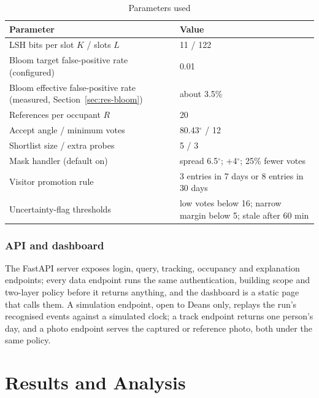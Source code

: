 \documentclass[12pt,a4paper,oneside]{report}
\begin{document}
\begin{table}[htbp]
\centering
\caption{Parameters used}\label{tab:params}
{\small\setlength{\tabcolsep}{4pt}\renewcommand{\arraystretch}{1.2}
\begin{tabular}{|p{7.39cm}|p{7.19cm}|}\hline
\textbf{Parameter} & \textbf{Value}\\\hline
LSH bits per slot $K$ / slots $L$ & 11 / 122\\\hline
Bloom target false-positive rate (configured) & 0.01\\\hline
Bloom effective false-positive rate (measured, Section~\ref{sec:res-bloom}) & about 3.5\%\\\hline
References per occupant $R$ & 20\\\hline
Accept angle / minimum votes & 80.43$^{\circ}$ / 12\\\hline
Shortlist size / extra probes & 5 / 3\\\hline
Mask handler (default on) & spread 6.5$^{\circ}$; +4$^{\circ}$; 25\% fewer votes\\\hline
Visitor promotion rule & 3 entries in 7 days or 8 entries in 30 days\\\hline
Uncertainty-flag thresholds & low votes below 16; narrow margin below 5; stale after 60 min\\\hline
\end{tabular}}
\end{table}

\subsection{API and dashboard}
The FastAPI server exposes login, query, tracking, occupancy and explanation endpoints; every data endpoint runs the same authentication, building scope and two-layer policy before it returns anything, and the dashboard is a static page that calls them. A simulation endpoint, open to Deans only, replays the run's recognised events against a simulated clock; a track endpoint returns one person's day, and a photo endpoint serves the captured or reference photo, both under the same policy.



\clearpage
\chapter{Results and Analysis}
\label{ch:results}
\end{document}
